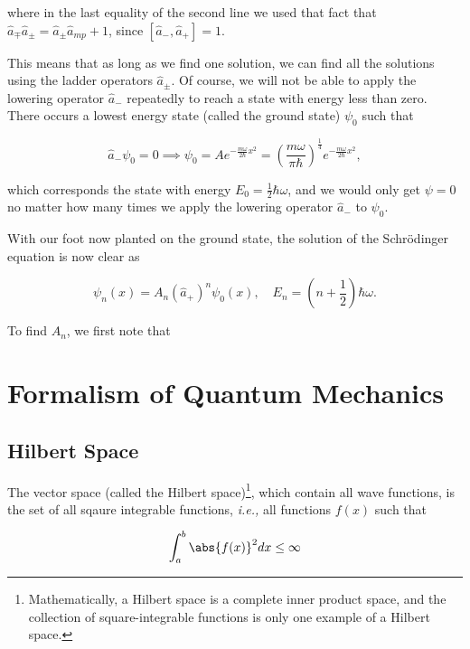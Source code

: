 \documentclass[a4paper,12pt]{report}
\begin{document}
where in the last equality of the second line we used that fact that \(\hat{a} _{\mp} \hat{a} _{\pm } = \hat{a} _{\pm } \hat{a} _{mp} + 1\), since \([\hat{a} _{-}, \hat{a} _{+}  ] = 1\).  

This means that as long as we find one solution, we can find all the solutions using the ladder operators \(\hat{a} _{\pm } \). Of course, we will not be able to apply the lowering operator \(\hat{a} _{-} \) repeatedly to reach a state with energy less than zero. There occurs a lowest energy state (called the ground state) \(\psi _{0} \) such that 

\begin{equation}
  \hat{a} _{-}\psi _{0} = 0 \implies \psi _{0} = Ae^{-\frac{m \omega }{2 \hbar }x^2 } = \left( \frac{m \omega }{\pi \hbar }  \right)^{\frac{1}{4} } e^{-\frac{m \omega }{2 \hbar }x^2 },
\end{equation}

which corresponds the state with energy \(\displaystyle E_{0} = \frac{1}{2}\hbar \omega   \), and we would only get \(\psi =0\)  no matter how many times we apply the lowering operator \(\hat{a} _{-} \) to \(\psi _{0} \).

With our foot now planted on the ground state, the solution of the Schrödinger equation is now clear as

\begin{equation}
  \psi _{n}(x) = A_{n} (\hat{a} _{+} )^{n} \psi _{0}(x), \quad E_{n} = \left( n+\frac{1}{2}  \right)\hbar \omega .
\end{equation}

To find \(A_{n} \), we first note that 




\chapter{Formalism of Quantum Mechanics}

\section{Hilbert Space}
The vector space (called the Hilbert space)\footnote{Mathematically, a Hilbert space is a complete inner product space, and the collection of square-integrable functions is only one example of a Hilbert space.}, which contain all wave functions, is the set of all sqaure integrable functions, \textit{i.e.,} all functions \(f(x)\) such that 

\begin{equation}
   \int_{a}^{b}   \abs{f(x)}^2dx \le \infty   
\end{equation}
\end{document}
